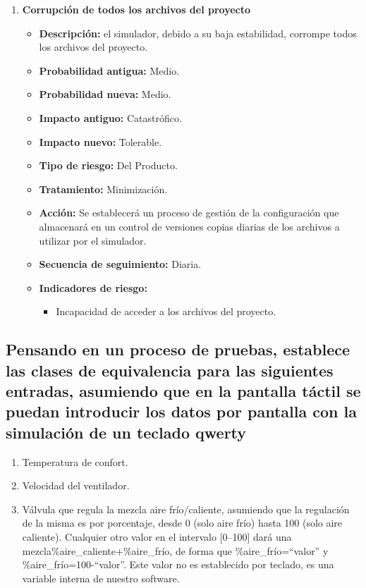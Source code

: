 \begin{enumerate}
    \item \textbf{Corrupción de todos los archivos del proyecto}
          \begin{itemize}
              \item \textbf{Descripción:} el simulador, debido a su baja estabilidad, corrompe todos los archivos del proyecto.
              \item \textbf{Probabilidad antigua:} Medio.
              \item \textbf{Probabilidad nueva:} Medio.
              \item \textbf{Impacto antiguo:} Catastrófico.
              \item \textbf{Impacto nuevo:} Tolerable.
              \item \textbf{Tipo de riesgo:} Del Producto.
              \item \textbf{Tratamiento:} Minimización.
              \item \textbf{Acción:} Se establecerá un proceso de gestión de la configuración que almacenará en un control de versiones copias diarias de los archivos a utilizar por el simulador.
              \item \textbf{Secuencia de seguimiento:} Diaria.
              \item \textbf{Indicadores de riesgo:}
                    \begin{itemize}
                        \item Incapacidad de acceder a los archivos del proyecto.
                    \end{itemize}
          \end{itemize}
\end{enumerate}


\subsection{Pensando en un proceso de pruebas, establece las clases de equivalencia para las siguientes entradas, asumiendo que en la pantalla táctil se puedan introducir los datos por pantalla con la simulación de un teclado qwerty}
\begin{enumerate}
    \item Temperatura de confort.
    \item Velocidad del ventilador.
    \item Válvula que regula la mezcla aire frío/caliente, asumiendo que la regulación de la misma es por porcentaje, desde 0 (solo aire frío) hasta 100 (solo aire caliente). Cualquier otro valor en el intervalo [0--100] dará una mezcla\%aire\_caliente+\%aire\_frío, de forma que \%aire\_frío=``valor'' y \%aire\_frío=100-``valor''. Este valor no es establecido por teclado, es una variable interna de nuestro software.
\end{enumerate}

